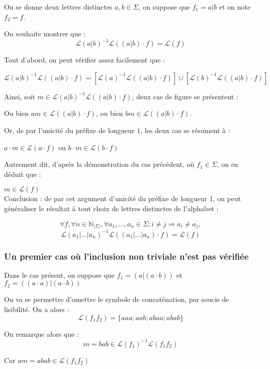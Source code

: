 \documentclass{article}
\begin{document}
On se donne deux lettres distinctes $a,b \in \Sigma$, on suppose que $f_1 = a|b$ et on note $f_2 = f$.

On souhaite montrer que :
$$\mathcal{L}(a|b)^{-1}\mathcal{L}((a|b) \cdot f) = \mathcal{L}(f)$$

Tout d'abord, on peut vérifier assez facilement que :

$$\mathcal{L}(a|b)^{-1}\mathcal{L}((a|b) \cdot f) = [\mathcal{L}(a)^{-1}\mathcal{L}((a|b) \cdot f)] \cup [\mathcal{L}(b)^{-1}\mathcal{L}((a|b) \cdot f)]$$

Ainsi, soit $m \in \mathcal{L}(a|b)^{-1}\mathcal{L}((a|b) \cdot f)$, deux cas de figure se présentent :

Ou bien $am \in \mathcal{L}((a|b) \cdot f)$, ou bien $bm \in \mathcal{L}((a|b) \cdot f)$.

Or, de par l'unicité du préfixe de longueur $1$, les deux cas se résument à :

$a \cdot m \in \mathcal{L}(a \cdot f)$ ou $b \cdot m \in \mathcal{L}(b \cdot f)$

Autrement dit, d'après la démonstration du cas précédent, où $f_1 \in \Sigma$, on en déduit que :

$m \in \mathcal{L}(f)$
\\

Conclusion : de par cet argument d'unicité du préfixe de longueur $1$, on peut généraliser le résultat à tout choix de lettres distinctes de l'alphabet :

$$\forall f, \forall n \in \mathbb{N}_{|\Sigma |},\forall a_1,...,a_n \in \Sigma; i \neq j \Rightarrow a_i \neq a_j, $$
$$\boxed{\mathcal{L}(a_1 | ... | a_n)^{-1}\mathcal{L}((a_1 | ... | a_n) \cdot f) = \mathcal{L}(f)}$$


\subsubsection{Un premier cas où l'inclusion non triviale n'est pas vérifiée}

Dans le cas présent, on suppose que $f_1 = (a | (a \cdot b))$ et $f_2 = ((a \cdot a) | (a \cdot b))$

On va se permettre d'omettre le symbole de concaténation, par soucis de lisibilité. On a alors :
$$\mathcal{L}(f_1f_2) = \{ aaa ; aab ; abaa ; abab \}$$

On remarque alors que :
$$m = bab \in \mathcal{L}(f_1)^{-1}\mathcal{L}(f_1f_2)$$

Car $am = abab \in \mathcal{L}(f_1f_2)$
\end{document}
